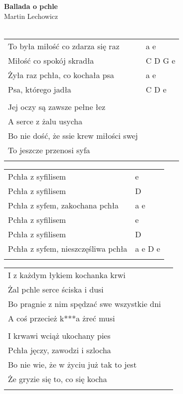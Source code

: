 \documentclass[a5paper]{article}
\begin{document}


\noindent
\fontsize{12pt}{15pt}\selectfont
\textbf{Ballada o pchle} \\
\fontsize{8pt}{10pt}\selectfont
Martin Lechowicz \\ \\
\fontsize{10pt}{12pt}\selectfont
{}
\begin{tabular}{@{}p{8.5cm}p{3cm}@{}}
\noindent
To była miłość co zdarza się raz & a e \\
Miłość co spokój skradła & C D G e \\
Żyła raz pchła, co kochała psa & a e \\
Psa, którego jadła & C D e \\ \\

Jej oczy są zawsze pełne łez \\
A serce z żalu usycha \\
Bo nie dość, że ssie krew miłości swej \\
To jeszcze przenosi syfa \\ \\
\end{tabular}

\noindent
\begin{tabular}{@{}p{7.5cm}p{3cm}@{}}
Pchła z syfilisem & e \\
Pchła z syfilisem & D \\
Pchła z syfem, zakochana pchła & a e \\

Pchła z syfilisem & e \\
Pchła z syfilisem & D \\
Pchła z syfem, nieszczęśliwa pchła & a e D e \\ \\
\end{tabular}

\noindent
\begin{tabular}{@{}p{8.5cm}p{3cm}@{}}
I z każdym łykiem kochanka krwi \\
Żal pchle serce ściska i dusi \\
Bo pragnie z nim spędzać swe wszystkie dni \\
A coś przecież k***a żreć musi \\ \\

I krwawi wciąż ukochany pies \\
Pchła jęczy, zawodzi i szlocha \\
Bo nie wie, że w życiu już tak to jest \\
Że gryzie się to, co się kocha \\ \\
\end{tabular}
\end{document}
